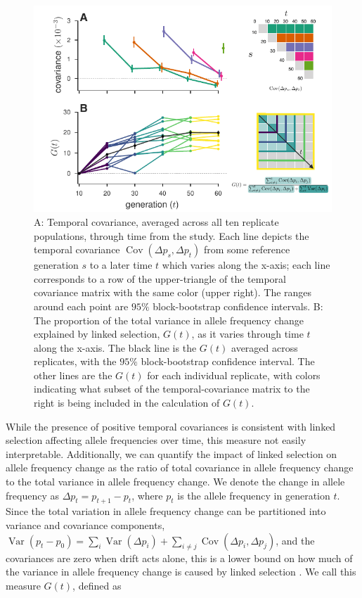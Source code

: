 \documentclass[11pt]{article}
\DeclareMathOperator{\var}{Var}
\DeclareMathOperator{\cov}{Cov}
\begin{document}
\begin{figure}[!htb]
  \centering
  \includegraphics[width=\textwidth]{figures/figure-1.pdf}

  \caption{A: Temporal covariance, averaged across all ten replicate
    populations, through time from the \textcite{Barghi2019-qy} study. Each
    line depicts the temporal covariance $\cov(\Delta p_s, \Delta p_t)$ from
    some reference generation $s$ to a later time $t$ which varies along the
    x-axis; each line corresponds to a row of the upper-triangle of the
    temporal covariance matrix with the same color (upper right). The ranges
    around each point are $95\%$ block-bootstrap confidence intervals. B: The
    proportion of the total variance in allele frequency change explained by
    linked selection, $G(t)$, as it varies through time $t$ along the x-axis.
    The black line is the $G(t)$ averaged across replicates, with the $95\%$
    block-bootstrap confidence interval. The other lines are the $G(t)$ for
    each individual replicate, with colors indicating what subset of the
    temporal-covariance matrix to the right is being included in the
  calculation of $G(t)$.}

  \label{fig:figure-1}
\end{figure}

While the presence of positive temporal covariances is consistent with linked
selection affecting allele frequencies over time, this measure not easily
interpretable. Additionally, we can quantify the impact of linked selection on
allele frequency change as the ratio of total covariance in allele frequency
change to the total variance in allele frequency change. We denote the
change in allele frequency as $\Delta p_t = p_{t+1}-p_t$, where $p_t$ is the
allele frequency in generation $t$. Since the total variation in allele
frequency change can be partitioned into variance and covariance components,
$\var(p_t - p_0) = \sum_{i} \var(\Delta p_i) + \sum_{i \ne j} \cov(\Delta
p_i, \Delta p_j)$, and the covariances are zero when drift acts alone, this is
a lower bound on how much of the variance in allele frequency change is caused
by linked selection \parencite{Buffalo2019-io}. We call this measure $G(t)$, defined as
\end{document}
